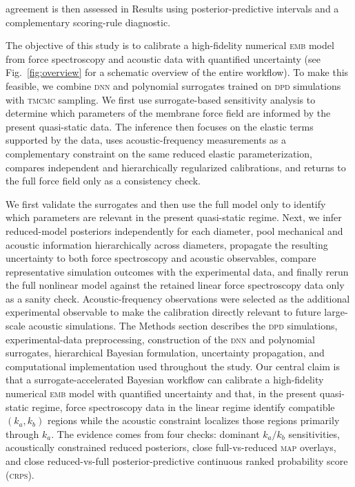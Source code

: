 \documentclass[%
 aip,
 jcp,
 amsmath,amssymb,
 preprint,%
]{revtex4-1}
\begin{document}
agreement is then assessed in Results using posterior-predictive intervals and a complementary scoring-rule diagnostic.

The objective of this study is to calibrate a high-fidelity numerical \textsc{emb} model from force spectroscopy and acoustic data with quantified uncertainty (see Fig.~\ref{fig:overview} for a schematic overview of the entire workflow). To make this feasible, we combine \textsc{dnn} and polynomial surrogates trained on \textsc{dpd} simulations with \textsc{tmcmc} sampling. We first use surrogate-based sensitivity analysis to determine which parameters of the membrane force field are informed by the present quasi-static data. The inference then focuses on the elastic terms supported by the data, uses acoustic-frequency measurements as a complementary constraint on the same reduced elastic parameterization, compares independent and hierarchically regularized calibrations, and returns to the full force field only as a consistency check.

We first validate the surrogates and then use the full model only to identify which parameters are relevant in the present quasi-static regime. Next, we infer reduced-model posteriors independently for each diameter, pool mechanical and acoustic information hierarchically across diameters, propagate the resulting uncertainty to both force spectroscopy and acoustic observables, compare representative simulation outcomes with the experimental data, and finally rerun the full nonlinear model against the retained linear force spectroscopy data only as a sanity check. Acoustic-frequency observations were selected as the additional experimental observable to make the calibration directly relevant to future large-scale acoustic simulations. The Methods section describes the \textsc{dpd} simulations, experimental-data preprocessing, construction of the \textsc{dnn} and polynomial surrogates, hierarchical Bayesian formulation, uncertainty propagation, and computational implementation used throughout the study. Our central claim is that a surrogate-accelerated Bayesian workflow can calibrate a high-fidelity numerical \textsc{emb} model with quantified uncertainty and that, in the present quasi-static regime, force spectroscopy data in the linear regime identify compatible $(k_a,k_b)$ regions while the acoustic constraint localizes those regions primarily through $k_a$. The evidence comes from four checks: dominant $k_a/k_b$ sensitivities, acoustically constrained reduced posteriors, close full-vs-reduced \textsc{map} overlays, and close reduced-vs-full posterior-predictive continuous ranked probability score (\textsc{crps}).
\end{document}

